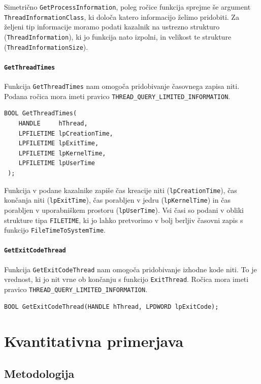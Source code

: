 \documentclass[a4paper,12pt,openright]{book}
\begin{document}
Simetrično \texttt{GetProcessInformation}, poleg ročice funkcija sprejme še argument \texttt{ThreadInformationClass}, ki določa katero informacijo želimo pridobiti.
Za željeni tip informacije moramo podati kazalnik na ustrezno strukturo (\texttt{ThreadInformation}), ki jo funkcija nato izpolni, in velikost te strukture (\texttt{ThreadInformationSize}).

\subsubsection{\texttt{GetThreadTimes}}

Funkcija \texttt{GetThreadTimes} nam omogoča pridobivanje časovnega zapisa niti.
Podana ročica mora imeti pravico \texttt{THREAD\_QUERY\_LIMITED\_INFORMATION}.

\begin{lstlisting}[style=func]
 BOOL GetThreadTimes(
	HANDLE     hThread,
	LPFILETIME lpCreationTime,
	LPFILETIME lpExitTime,
	LPFILETIME lpKernelTime,
	LPFILETIME lpUserTime
 );
\end{lstlisting}

Funkcija v podane kazalnike zapiše čas kreacije niti (\texttt{lpCreationTime}), čas končanja niti (\texttt{lpExitTime}), čas porabljen v jedru (\texttt{lpKernelTime}) in čas porabljen v uporabniškem prostoru (\texttt{lpUserTime}).
Vsi časi so podani v obliki strukture tipa \texttt{FILETIME}, ki jo lahko pretvorimo v bolj berljiv časovni zapis s funkcijo \texttt{FileTimeToSystemTime}.

\subsubsection{\texttt{GetExitCodeThread}}

Funkcija \texttt{GetExitCodeThread} nam omogoča pridobivanje izhodne kode niti.
To je vrednost, ki jo nit vrne ob končanju s funkcijo \texttt{ExitThread}.
Ročica mora imeti pravico \texttt{THREAD\_QUERY\_LIMITED\_INFORMATION}.

\begin{lstlisting}[style=func]
 BOOL GetExitCodeThread(HANDLE hThread, LPDWORD lpExitCode);
\end{lstlisting}

\chapter{Kvantitativna primerjava}

\section{Metodologija}
\end{document}
